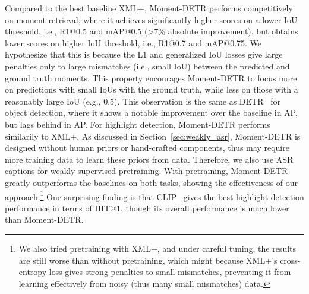 Compared to the best baseline XML+, Moment-DETR performs competitively on moment retrieval, where it achieves significantly higher scores on a lower IoU threshold, i.e., R1@0.5 and mAP@0.5 (>7\% absolute improvement), but obtains lower scores on higher IoU threshold, i.e., R1@0.7 and mAP@0.75.
We hypothesize that this is because the L1 and generalized IoU losses give large penalties only to large mismatches (i.e., small IoU) between the predicted and ground truth moments.
This property encourages Moment-DETR to focus more on predictions with small IoUs with the ground truth, while less on those with a reasonably large IoU (e.g., 0.5).
This observation is the same as DETR~\cite{carion2020end} for object detection, where it shows a notable improvement over the baseline in AP, but lags behind in AP.
For highlight detection, Moment-DETR performs similarily to XML+.
As discussed in Section~\ref{sec:weakly_asr}, Moment-DETR is designed without human priors or hand-crafted components, thus may require more training data to learn these priors from data.
Therefore, we also use ASR captions for weakly supervised pretraining.
With pretraining, Moment-DETR greatly outperforms the baselines on both tasks, showing the effectiveness of our approach.\footnote{We also tried pretraining with XML+, and under careful tuning, the results are still worse than without pretraining, which might because XML+'s cross-entropy loss gives strong penalties to small mismatches, preventing it from learning effectively from noisy (thus many small mismatches) data.} 
One surprising finding is that CLIP~\cite{radford2021learning} gives the best highlight detection performance in terms of HIT@1, though its overall performance is much lower than Moment-DETR.



\begin{table}[t!]
\setlength{\tabcolsep}{0.2em}
\small
\centering
\caption{Loss ablations on \DatasetName~\textit{val} split. 
All models are trained from scratch.}
\label{tab:loss_ablation}
\end{table}





